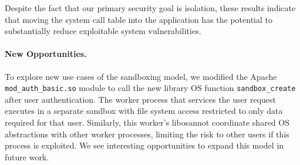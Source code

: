 



 
\begin{comment}
As Table \ref{table:vulnerabilities} illustrates almost all Linux
system call-related vulnerabilities are prevented through the \sysname{}
paradigm. These vulnerabilities are related to system calls or flags
that are blocked or restricted in \sysname{}, such as I/O control, event
polling and notification, huge pages, socket options, task stats,
\emph{etc.}  \sysname{} also restricts rarely used network protocols
such as VSOCK, TIPC and ROSE, and this prevents 41\% of network
vulnerabilities in \sysname{} systems. The Manifest file used to
restrict portions of the file system also prevented 2 FS-related
vulnerabilities. We also considered vulnerabilities in Linux
applications as preventable by \sysname{}, as all the effects are
confined in the correspondent \picoproc{} or sandbox. 
\end{comment}



Despite the fact that our primary security goal is isolation, 
these results indicate that moving the system call table into 
the application has the potential to substantially reduce exploitable 
system vulnerabilities.

\paragraph{New Opportunities.}
To explore new use cases of the \sysname{} sandboxing model, we modified the 
Apache {\tt mod\_\-auth\_\-basic.so} module to call the new library OS function
{\tt sandbox\_create} after user authentication.
The work\-er process that services the user request executes in a separate sandbox 
with file system access restricted to only data required for that user.
Similarly, this worker's libosannot coordinate shared OS abstractions with other worker processes,
limiting the risk to other users if this process is exploited.
We see interesting opportunities to expand this model in future work.

